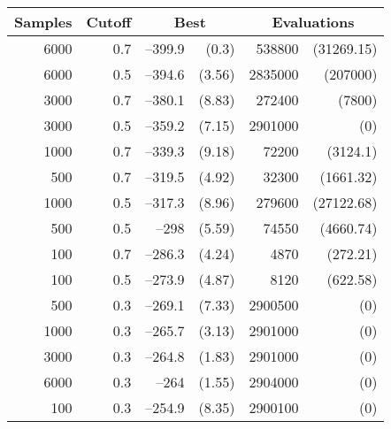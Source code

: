 \begin{table}[tbp]
\centering
\caption{}
\begin{tabular}{|r|r|rr|rr|}
\hline
\multicolumn{1}{|c|}{Samples} & \multicolumn{1}{c|}{Cutoff} &
 \multicolumn{2}{c|}{Best} & 
 \multicolumn{2}{c|}{Evaluations}  \\ \hline
6000 & 0.7 & --399.9 & (0.3) & 538800 & (31269.15) \\ \hline
6000 & 0.5 & --394.6 & (3.56) & 2835000 & (207000) \\ \hline
3000 & 0.7 & --380.1 & (8.83) & 272400 & (7800) \\ \hline
3000 & 0.5 & --359.2 & (7.15) & 2901000 & (0) \\ \hline
1000 & 0.7 & --339.3 & (9.18) & 72200 & (3124.1) \\ \hline
500 & 0.7 & --319.5 & (4.92) & 32300 & (1661.32) \\ \hline
1000 & 0.5 & --317.3 & (8.96) & 279600 & (27122.68) \\ \hline
500 & 0.5 & --298 & (5.59) & 74550 & (4660.74) \\ \hline
100 & 0.7 & --286.3 & (4.24) & 4870 & (272.21) \\ \hline
100 & 0.5 & --273.9 & (4.87) & 8120 & (622.58) \\ \hline
500 & 0.3 & --269.1 & (7.33) & 2900500 & (0) \\ \hline
1000 & 0.3 & --265.7 & (3.13) & 2901000 & (0) \\ \hline
3000 & 0.3 & --264.8 & (1.83) & 2901000 & (0) \\ \hline
6000 & 0.3 & --264 & (1.55) & 2904000 & (0) \\ \hline
100 & 0.3 & --254.9 & (8.35) & 2900100 & (0) \\ \hline
\end{tabular}
\label{ce-onemax}
\end{table}


